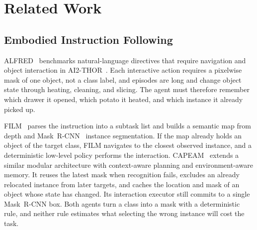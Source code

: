 \documentclass[conference]{IEEEtran}
\begin{document}
\section{Related Work}
\subsection{Embodied Instruction Following}
ALFRED~\cite{shridhar2020alfred} benchmarks natural-language directives that require navigation and object interaction in AI2-THOR~\cite{kolve2017ai2thor}.
Each interactive action requires a pixelwise mask of one object, not a class label, and episodes are long and change object state through heating, cleaning, and slicing.
The agent must therefore remember which drawer it opened, which potato it heated, and which instance it already picked up.

FILM~\cite{min2022film} parses the instruction into a subtask list and builds a semantic map from depth and Mask~R-CNN~\cite{he2017maskrcnn} instance segmentation.
If the map already holds an object of the target class, FILM navigates to the closest observed instance, and a deterministic low-level policy performs the interaction.
CAPEAM~\cite{kim2023capeam} extends a similar modular architecture with context-aware planning and environment-aware memory.
It reuses the latest mask when recognition fails, excludes an already relocated instance from later targets, and caches the location and mask of an object whose state has changed.
Its interaction executor still commits to a single Mask~R-CNN box.
Both agents turn a class into a mask with a deterministic rule, and neither rule estimates what selecting the wrong instance will cost the task.
\end{document}
